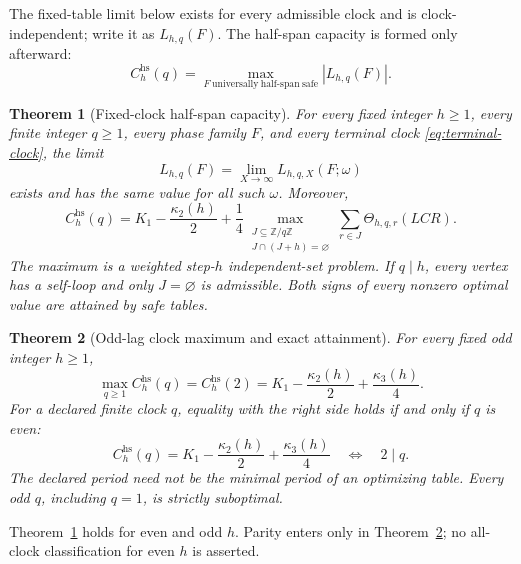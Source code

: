 \documentclass[11pt]{article}
\newtheorem{theorem}{Theorem}[section]
\theoremstyle{definition}
\theoremstyle{remark}
\newcommand{\Z}{\mathbb Z}
\newcommand{\hcap}{C^{\mathrm{hs}}}
\begin{document}
The fixed-table limit below exists for every admissible clock and is
clock-independent; write it as \(L_{h,q}(F)\).  The half-span capacity is
formed only afterward:
\begin{equation}
 \hcap_h(q)=
 \max_{F\ \mathrm{universally\ half\text{-}span\ safe}}
 |L_{h,q}(F)|.
 \label{eq:half-span-capacity}
\end{equation}

\begin{theorem}[Fixed-clock half-span capacity]
\label{thm:fixed-clock-half-span}
For every fixed integer \(h\geq1\), every finite integer \(q\geq1\),
every phase family \(F\), and every terminal clock
\eqref{eq:terminal-clock}, the limit
\[
 L_{h,q}(F)=\lim_{X\to\infty}L_{h,q,X}(F;\omega)
\]
exists and has the same value for all such \(\omega\).  Moreover,
\begin{equation}
 \boxed{
 \hcap_h(q)=K_1-\frac{\kappa_2(h)}2
 +\frac14
 \max_{\substack{J\subseteq\Z/q\Z\\J\cap(J+h)=\varnothing}}
 \sum_{r\in J}\Theta_{h,q,r}(LCR).}
 \label{eq:fixed-clock-formula}
\end{equation}
The maximum is a weighted step-\(h\) independent-set problem.  If
\(q\mid h\), every vertex has a self-loop and only \(J=\varnothing\) is
admissible.  Both signs of every nonzero optimal value are attained by
safe tables.
\end{theorem}

\begin{theorem}[Odd-lag clock maximum and exact attainment]
\label{thm:odd-lag-clock-maximum}
For every fixed odd integer \(h\geq1\),
\begin{equation}
 \boxed{
 \max_{q\geq1}\hcap_h(q)=\hcap_h(2)
 =K_1-\frac{\kappa_2(h)}2+\frac{\kappa_3(h)}4.}
 \label{eq:odd-clock-maximum}
\end{equation}
For a declared finite clock \(q\), equality with the right side holds
if and only if \(q\) is even:
\begin{equation}
 \hcap_h(q)=K_1-\frac{\kappa_2(h)}2+\frac{\kappa_3(h)}4
 \quad\Longleftrightarrow\quad 2\mid q.
 \label{eq:attainment-parity}
\end{equation}
The declared period need not be the minimal period of an optimizing
table.  Every odd \(q\), including \(q=1\), is strictly suboptimal.
\end{theorem}

Theorem~\ref{thm:fixed-clock-half-span} holds for even and odd \(h\).
Parity enters only in Theorem~\ref{thm:odd-lag-clock-maximum}; no
all-clock classification for even \(h\) is asserted.
\end{document}
